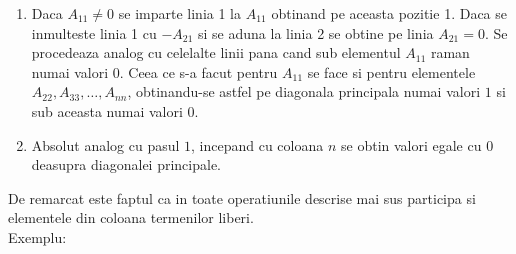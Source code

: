 \documentclass{article}
\begin{document}
        \begin{enumerate}
            \item Daca $A_{11}\neq 0$ se imparte linia 1 la $A_{11}$ obtinand pe aceasta pozitie 1. Daca se inmulteste linia 1 cu $-A_{21}$ si se aduna la linia
                2 se obtine pe linia $A_{21} = 0$. Se procedeaza analog cu celelalte linii pana cand sub elementul $A_{11}$ raman numai valori $0$. Ceea ce s-a
                facut pentru $A_{11}$ se face si pentru elementele $A_{22}, A_{33}, \dots ,A_{nn}$, obtinandu-se astfel pe diagonala principala numai valori $1$ si sub aceasta numai valori $0$.
            \item Absolut analog cu pasul $1$, incepand cu coloana $n$ se obtin valori egale cu $0$ deasupra diagonalei principale.
        \end{enumerate}
        De remarcat este faptul ca in toate operatiunile descrise mai sus participa si elementele din coloana termenilor liberi. \\
		Exemplu: \\
\end{document}
